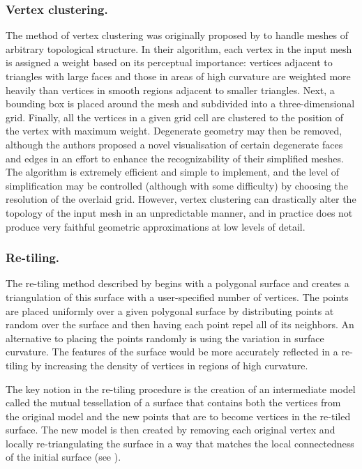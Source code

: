 \subsubsection*{Vertex clustering.}
The method of vertex clustering was originally proposed by \cite{Rossignac93} to handle meshes of arbitrary topological structure. In their algorithm, each vertex in the input mesh is assigned a weight based on its perceptual importance: vertices adjacent to triangles with large faces and those in areas of high curvature are weighted more heavily than vertices in smooth regions adjacent to smaller triangles. Next, a bounding box is placed around the mesh and subdivided into a three-dimensional grid. Finally, all the vertices in a given grid cell are clustered to the position of the vertex with maximum weight. Degenerate geometry may then be removed, although the authors proposed a novel visualisation of certain degenerate faces and edges in an effort to enhance the recognizability of their simplified meshes. The algorithm is extremely efficient and simple to implement, and the level of simplification may be controlled (although with some difficulty) by choosing the resolution of the overlaid grid. However, vertex clustering can drastically alter the topology of the input mesh in an unpredictable manner, and in practice does not produce very faithful geometric approximations at low levels of detail.

\subsubsection*{Re-tiling.}
The re-tiling method described by \cite{Turk92} begins with a polygonal surface and creates a triangulation of this surface with a user-specified number of vertices. The points are placed uniformly over a given polygonal surface by distributing points at random over the surface and then having each point repel all of its neighbors. An alternative to placing the points randomly is using the variation in surface curvature. The features of the surface would be more accurately reflected in a re-tiling by increasing the density of vertices in regions of high curvature.

The key notion in the re-tiling procedure is the creation of an intermediate model called the mutual tessellation of a surface that contains both the vertices from the original model and the new points that are to become vertices in the re-tiled surface. The new model is then created by removing each original vertex and locally re-triangulating the surface in a way that matches the local connectedness of the initial surface (see ).

